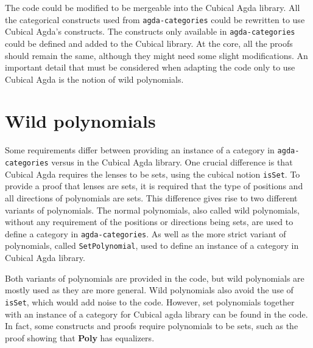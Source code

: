 The code could be modified to be mergeable into the Cubical Agda library. All the categorical constructs used from \texttt{agda-categories} could be rewritten to use Cubical Agda's constructs. The constructs only available in \texttt{agda-categories} could be defined and added to the Cubical library. At the core, all the proofs should remain the same, although they might need some slight modifications. An important detail that must be considered when adapting the code only to use Cubical Agda is the notion of wild polynomials.

\section{Wild polynomials}
Some requirements differ between providing an instance of a category in \texttt{agda-categories} versus in the Cubical Agda library.
One crucial difference is that Cubical Agda requires the lenses to be sets, using the cubical notion \texttt{isSet}. To provide a proof that lenses are sets, it is required that the type of positions and all directions of polynomials are sets. This difference gives rise to two different variants of polynomials. The normal polynomials, also called wild polynomials, without any requirement of the positions or directions being sets, are used to define a category in \texttt{agda-categories}. As well as the more strict variant of polynomials, called \texttt{SetPolynomial}, used to define an instance of a category in Cubical Agda library. 

Both variants of polynomials are provided in the code, but wild polynomials are mostly used as they are more general. Wild polynomials also avoid the use of \texttt{isSet}, which would add noise to the code. However, set polynomials together with an instance of a category for Cubical agda library can be found in the code. In fact, some constructs and proofs require polynomials to be sets, such as the proof showing that \textbf{Poly} has equalizers.


